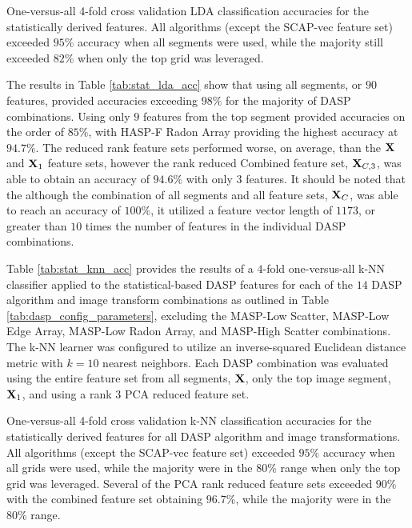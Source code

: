 \begin{table}[tb]
	\caption{One-versus-all 4-fold cross validation LDA classification accuracies for the statistically derived features.  All algorithms (except the SCAP-vec feature set) exceeded $95\%$ accuracy when all segments were used, while the majority still exceeded $82\%$ when only the top grid was leveraged.  }
	\centering
	\label{tab:stat_lda_acc}
\end{table}

The results in Table \ref{tab:stat_lda_acc} show that using all segments, or $90$ features, provided accuracies exceeding $98\%$ for the majority of DASP combinations.  Using only $9$ features from the top segment provided accuracies on the order of $85\%$, with HASP-F Radon Array providing the highest accuracy at $94.7\%$.  The reduced rank feature sets performed worse, on average, than the $\textit{\bf{X}}$ and $\textit{\bf{X}}_1$ feature sets, however the rank reduced Combined feature set, $\textit{\bf{X}}_{C,3}$, was able to obtain an accuracy of $94.6\%$ with only $3$ features.  It should be noted that the although the combination of all segments and all feature sets, $\textit{\bf{X}}_C$, was able to reach an accuracy of $100\%$, it utilized a feature vector length of $1173$, or greater than $10$ times the number of features in the individual DASP combinations.

Table \ref{tab:stat_knn_acc} provides the results of a $4$-fold one-versus-all k-NN classifier applied to the statistical-based DASP features for each of the $14$ DASP algorithm and image transform combinations as outlined in Table \ref{tab:dasp_config_parameters}, excluding the MASP-Low Scatter, MASP-Low Edge Array, MASP-Low Radon Array, and MASP-High Scatter combinations.  The k-NN learner was configured to utilize an inverse-squared Euclidean distance metric with $k=10$ nearest neighbors.  Each DASP combination was evaluated using the entire feature set from all segments, $\textit{\bf{X}}$, only the top image segment, $\textit{\bf{X}}_1$, and using a rank $3$ PCA reduced feature set.  

\begin{table}[tb]
	\caption{One-versus-all 4-fold cross validation k-NN classification accuracies for the statistically derived features for all DASP algorithm and image transformations.  All algorithms (except the SCAP-vec feature set) exceeded $95\%$ accuracy when all grids were used, while the majority were in the $80\%$ range when only the top grid was leveraged.  Several of the PCA rank reduced feature sets exceeded $90\%$ with the combined feature set obtaining $96.7\%$, while the majority were in the $80\%$ range.}
	\centering
	\label{tab:stat_knn_acc}
\end{table}

